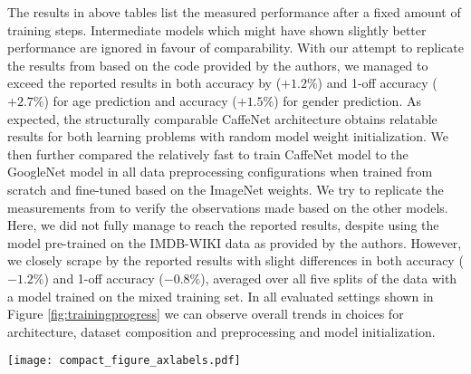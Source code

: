 \documentclass[10pt,twocolumn,letterpaper]{article}
\begin{document}
The results in above tables list the measured performance after a fixed amount of training steps. Intermediate models which might have shown slightly better performance are ignored in favour of comparability.
With our attempt to replicate the results from \cite{levi2015age} based on the code provided by the authors, we managed to exceed the reported results in both accuracy by ($+1.2\%$) and 1-off accuracy ($+2.7\%$) for age prediction and accuracy ($+1.5\%$) for gender prediction. As expected, the structurally comparable CaffeNet architecture obtains relatable results for both learning problems with random model weight initialization. We then further compared the relatively fast to train CaffeNet model to the GoogleNet model in all data  preprocessing configurations when trained from scratch and fine-tuned based on the ImageNet weights. We try to replicate the measurements from \cite{rothe2016deep} to verify the observations made based on the other models. Here, we did not fully manage to reach the reported results, despite using the model pre-trained on the IMDB-WIKI data as provided by the authors. However, we closely scrape by the reported results with slight differences in both accuracy ($-1.2\%$) and 1-off accuracy ($-0.8\%$), averaged over all five splits of the data with a model trained on the mixed training set.
In all evaluated settings shown in Figure \ref{fig:trainingprogress} we can observe overall trends in choices for architecture, dataset composition and preprocessing and model initialization.

\begin{figure*}
\begin{center}
\texttt{[image: compact\_figure\_axlabels.pdf]}
\end{center}
	\caption{The plots are ordered column-wise over model architectures and row-wise according to prediction problem, showing model performance over training time given different initializations and data preprocessing settings.
	The top and bottom dashed lines in each plot show worst and best reference accuracy results from \cite{levi2015age,rothe2016deep} and \cite{dehghan2017dager}, with the horizontal axis increasing with training iterations.
	Thick lines show results taken by us. Color coding corresponds to data preprocessing and shading to model initialization: Blue color stands for affine $[$i$]$n-plane alignment. Violet lines correspond to $[$r$]$otation alignment. Orange lines show the model performances for training on the $[$m$]$ixed training set. Translucent line color stands for training with random model initialization, fully opaque and solid lines show performance for finetuning on ImageNet weights and dashed lines correspond to model initialization using IMDB-WIKI weights, only applied to the VGG-16 model.
	All results are averaged over the five splits of the Adience data set.}
	\label{fig:trainingprogress}
\end{figure*}
\end{document}
